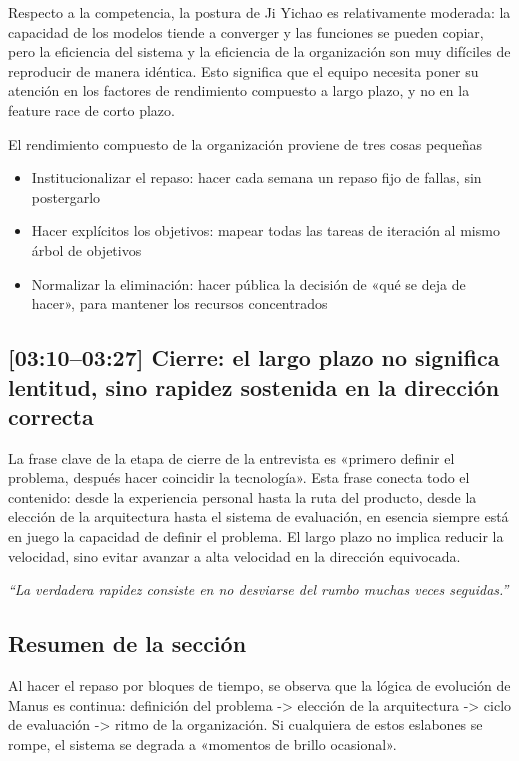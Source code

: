 Respecto a la competencia, la postura de Ji Yichao es relativamente moderada: la capacidad de los modelos tiende a converger y las funciones se pueden copiar, pero la eficiencia del sistema y la eficiencia de la organización son muy difíciles de reproducir de manera idéntica. Esto significa que el equipo necesita poner su atención en los factores de rendimiento compuesto a largo plazo, y no en la feature race de corto plazo.

\begin{knowledgebox}{El rendimiento compuesto de la organización proviene de tres cosas pequeñas}
\begin{itemize}
    \item Institucionalizar el repaso: hacer cada semana un repaso fijo de fallas, sin postergarlo
    \item Hacer explícitos los objetivos: mapear todas las tareas de iteración al mismo árbol de objetivos
    \item Normalizar la eliminación: hacer pública la decisión de «qué se deja de hacer», para mantener los recursos concentrados
\end{itemize}
\end{knowledgebox}

\subsection{[03:10--03:27] Cierre: el largo plazo no significa lentitud, sino rapidez sostenida en la dirección correcta}

La frase clave de la etapa de cierre de la entrevista es «primero definir el problema, después hacer coincidir la tecnología». Esta frase conecta todo el contenido: desde la experiencia personal hasta la ruta del producto, desde la elección de la arquitectura hasta el sistema de evaluación, en esencia siempre está en juego la capacidad de definir el problema. El largo plazo no implica reducir la velocidad, sino evitar avanzar a alta velocidad en la dirección equivocada.

\textit{``La verdadera rapidez consiste en no desviarse del rumbo muchas veces seguidas.''}

\subsection{Resumen de la sección}

Al hacer el repaso por bloques de tiempo, se observa que la lógica de evolución de Manus es continua: definición del problema -> elección de la arquitectura -> ciclo de evaluación -> ritmo de la organización. Si cualquiera de estos eslabones se rompe, el sistema se degrada a «momentos de brillo ocasional».

